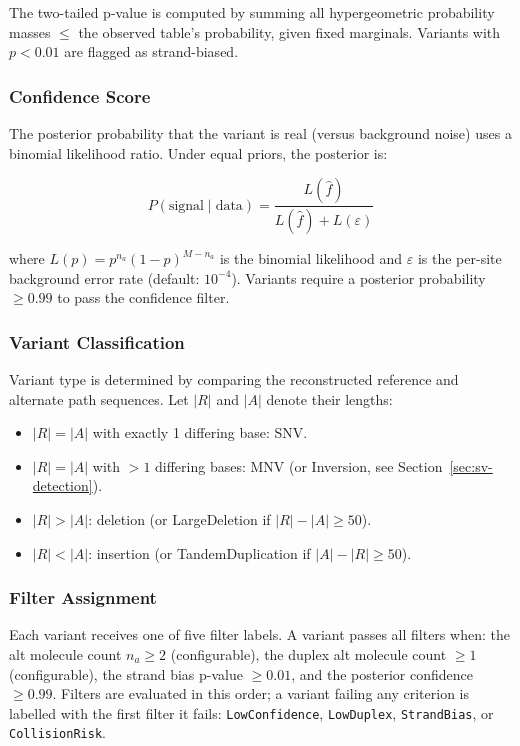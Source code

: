 The two-tailed p-value is computed by summing all hypergeometric probability masses $\le$ the observed table's probability, given fixed marginals.
Variants with $p < 0.01$ are flagged as strand-biased.

\subsubsection{Confidence Score}

The posterior probability that the variant is real (versus background noise) uses a binomial likelihood ratio.
Under equal priors, the posterior is:

\begin{equation}
  \label{eq:confidence}
  P(\text{signal} \mid \text{data}) = \frac{L(\hat{f})}{L(\hat{f}) + L(\varepsilon)}
\end{equation}

\noindent where $L(p) = p^{n_a} (1 - p)^{M - n_a}$ is the binomial likelihood and $\varepsilon$ is the per-site background error rate (default: $10^{-4}$).
Variants require a posterior probability $\ge 0.99$ to pass the confidence filter.

\subsubsection{Variant Classification}

Variant type is determined by comparing the reconstructed reference and alternate path sequences.
Let $|R|$ and $|A|$ denote their lengths:

\begin{itemize}
  \item $|R| = |A|$ with exactly 1 differing base: SNV.
  \item $|R| = |A|$ with $>1$ differing bases: MNV (or Inversion, see Section~\ref{sec:sv-detection}).
  \item $|R| > |A|$: deletion (or LargeDeletion if $|R| - |A| \ge 50$).
  \item $|R| < |A|$: insertion (or TandemDuplication if $|A| - |R| \ge 50$).
\end{itemize}

\subsubsection{Filter Assignment}

Each variant receives one of five filter labels.
A variant passes all filters when: the alt molecule count $n_a \ge 2$ (configurable), the duplex alt molecule count $\ge 1$ (configurable), the strand bias p-value $\ge 0.01$, and the posterior confidence $\ge 0.99$.
Filters are evaluated in this order; a variant failing any criterion is labelled with the first filter it fails: \texttt{LowConfidence}, \texttt{LowDuplex}, \texttt{StrandBias}, or \texttt{CollisionRisk}.


